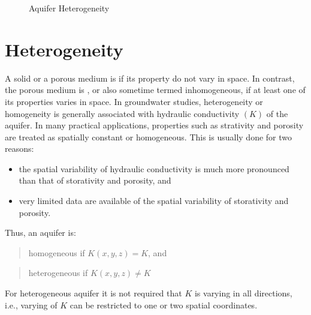 \documentclass[letterpaper,10pt,english]{jupyterBook}
\begin{document}
\begin{figure}[htbp]
\centering
\capstart

\noindent{}
\caption{Aquifer Heterogeneity}\label{\detokenize{content/flow/L5/15_het_iso:aquifer-het}}\end{figure}


\section{Heterogeneity}
\label{\detokenize{content/flow/L5/15_het_iso:heterogeneity}}
\sphinxAtStartPar
A solid or a porous medium is  if its property do not vary in space. In contrast, the porous medium is , or also sometime termed inhomogeneous, if at least one of its properties varies in space. In groundwater studies, heterogeneity or homogeneity is generally associated with hydraulic conductivity \((K)\) of the aquifer. In many practical applications, properties such as strativity and porosity are treated as spatially constant or homogeneous. This is usually done for two reasons:
\begin{itemize}
\item {} 
\sphinxAtStartPar
the spatial variability of hydraulic conductivity is much more pronounced than that of storativity and porosity, and

\item {} 
\sphinxAtStartPar
very limited data are available of the spatial variability of storativity and porosity.

\end{itemize}

\sphinxAtStartPar
Thus, an aquifer is:
\begin{quote}

\sphinxAtStartPar
homogeneous if \(K (x, y, z) = K\), and
\end{quote}
\begin{quote}

\sphinxAtStartPar
heterogeneous if \(K (x, y, z) \neq K\)
\end{quote}

\sphinxAtStartPar
For heterogeneous aquifer it is not required that \(K\) is varying in all directions, i.e., varying of \(K\) can be restricted to one or two spatial coordinates.
\end{document}
